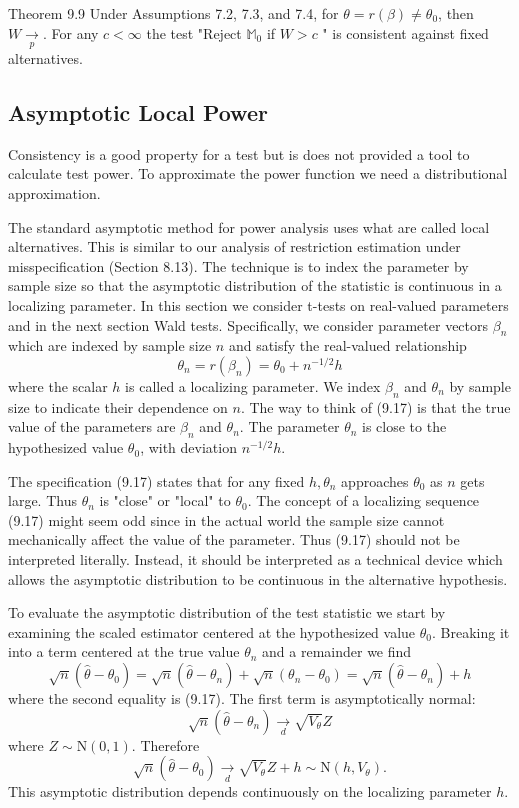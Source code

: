 \documentclass[10pt]{article}
\begin{document}
Theorem 9.9 Under Assumptions 7.2, 7.3, and 7.4, for $\theta=r(\beta) \neq \theta_{0}$, then $W \underset{p}{\longrightarrow}$. For any $c<\infty$ the test "Reject $\mathbb{M}_{0}$ if $W>c$ " is consistent against fixed alternatives.

\subsection{Asymptotic Local Power}
Consistency is a good property for a test but is does not provided a tool to calculate test power. To approximate the power function we need a distributional approximation.

The standard asymptotic method for power analysis uses what are called local alternatives. This is similar to our analysis of restriction estimation under misspecification (Section 8.13). The technique is to index the parameter by sample size so that the asymptotic distribution of the statistic is continuous in a localizing parameter. In this section we consider t-tests on real-valued parameters and in the next section Wald tests. Specifically, we consider parameter vectors $\beta_{n}$ which are indexed by sample size $n$ and satisfy the real-valued relationship
$$
\theta_{n}=r\left(\beta_{n}\right)=\theta_{0}+n^{-1 / 2} h
$$
where the scalar $h$ is called a localizing parameter. We index $\beta_{n}$ and $\theta_{n}$ by sample size to indicate their dependence on $n$. The way to think of (9.17) is that the true value of the parameters are $\beta_{n}$ and $\theta_{n}$. The parameter $\theta_{n}$ is close to the hypothesized value $\theta_{0}$, with deviation $n^{-1 / 2} h$.

The specification (9.17) states that for any fixed $h, \theta_{n}$ approaches $\theta_{0}$ as $n$ gets large. Thus $\theta_{n}$ is "close" or "local" to $\theta_{0}$. The concept of a localizing sequence (9.17) might seem odd since in the actual world the sample size cannot mechanically affect the value of the parameter. Thus (9.17) should not be interpreted literally. Instead, it should be interpreted as a technical device which allows the asymptotic distribution to be continuous in the alternative hypothesis.

To evaluate the asymptotic distribution of the test statistic we start by examining the scaled estimator centered at the hypothesized value $\theta_{0}$. Breaking it into a term centered at the true value $\theta_{n}$ and a remainder we find
$$
\sqrt{n}\left(\widehat{\theta}-\theta_{0}\right)=\sqrt{n}\left(\widehat{\theta}-\theta_{n}\right)+\sqrt{n}\left(\theta_{n}-\theta_{0}\right)=\sqrt{n}\left(\widehat{\theta}-\theta_{n}\right)+h
$$
where the second equality is (9.17). The first term is asymptotically normal:
$$
\sqrt{n}\left(\widehat{\theta}-\theta_{n}\right) \underset{d}{\longrightarrow} \sqrt{V_{\theta}} Z
$$
where $Z \sim \mathrm{N}(0,1)$. Therefore
$$
\sqrt{n}\left(\widehat{\theta}-\theta_{0}\right) \underset{d}{\longrightarrow} \sqrt{V_{\theta}} Z+h \sim \mathrm{N}\left(h, V_{\theta}\right) .
$$
This asymptotic distribution depends continuously on the localizing parameter $h$.
\end{document}
